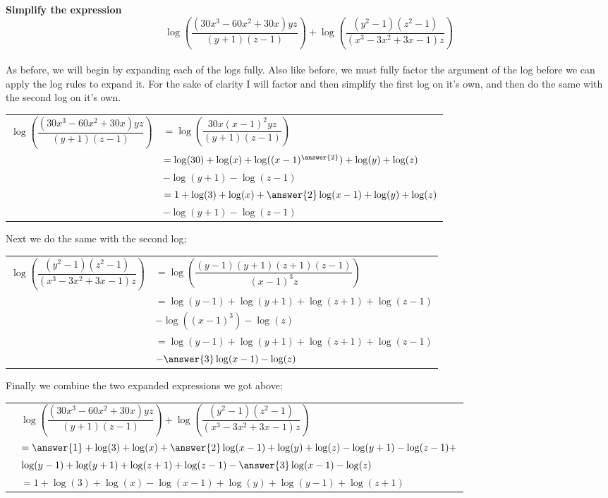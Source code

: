\documentclass{ximera}
\begin{document}
    \begin{example}
    {\bfseries Simplify the expression 
    \[
        \log\left( \dfrac{(30x^3 - 60x^2 + 30x)yz}{(y+1)(z-1)} \right) + \log\left( \dfrac{(y^2-1)(z^2-1)}{(x^3 - 3x^2 + 3x - 1)z} \right)
    \]
    }\\%
    
        As before, we will begin by expanding each of the logs fully. Also like before, we must fully factor the argument of the log before we can apply the log rules to expand it. For the sake of clarity I will factor and then simplify the first log on it's own, and then do the same with the second log on it's own.\\
        
        \begin{tabular}{ll}
            $\log\left( \dfrac{(30x^3 - 60x^2 + 30x)yz}{(y+1)(z-1)} \right)$ & $= \log\left( \dfrac{30x(x-1)^2yz}{(y+1)(z-1)} \right)$\\
            & $= \log(30) + \log(x) + \log((x-1)^{\answer{2}}) + \log(y) + \log(z)$\\
            & $ - \log(y+1) - \log(z-1)$\\
            & $= 1 + \log(3) + \log(x) + \answer{2}\log(x-1) + \log(y) + \log(z)$\\
            & $ - \log(y+1) - \log(z-1)$
        \end{tabular}
        
        Next we do the same with the second log;
        
        \begin{tabular}{ll}
            $\log\left( \dfrac{(y^2-1)(z^2-1)}{(x^3 - 3x^2 + 3x - 1)z} \right)$ 
            & $= \log\left( \dfrac{(y-1)(y+1)(z+1)(z-1)}{(x-1)^3z} \right)$\\
            & $= \log(y-1) + \log(y+1) + \log(z+1) + \log(z-1)$\\
            & $  - \log((x-1)^3) - \log(z)$\\
            & $= \log(y-1) + \log(y+1) + \log(z+1) + \log(z-1)$\\
            & $  - \answer{3}\log(x-1) - \log(z)$
        \end{tabular}
        
        Finally we combine the two expanded expressions we got above;
        
        \begin{tabular}{ll}
            & $ \log\left( \dfrac{(30x^3 - 60x^2 + 30x)yz}{(y+1)(z-1)} \right) + \log\left( \dfrac{(y^2-1)(z^2-1)}{(x^3 - 3x^2 + 3x - 1)z} \right) $ \\
            & $= \answer{1} + \log(3) + \log(x) + \answer{2}\log(x-1) + \log(y) + \log(z) - \log(y+1) - \log(z-1) + $\\
            & $  \log(y-1) + \log(y+1) + \log(z+1) + \log(z-1) - \answer{3}\log(x-1) - \log(z)$ \\
            & $= 1 + \log(3) + \log(x) - \log(x-1) + \log(y) + \log(y-1) + \log(z+1)$
        \end{tabular}
    \end{example}%
\end{document}
